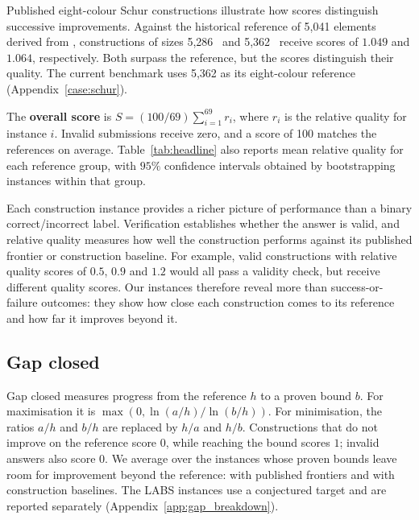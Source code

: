 \documentclass{article}
\begin{document}
Published eight-colour Schur constructions illustrate how scores distinguish successive improvements. Against the historical reference of 5,041 elements derived from \citet{fredricksen2000schur}, constructions of sizes 5,286~\citep{rowley2021templates} and 5,362~\citep{bengone2026schur} receive scores of $1.049$ and $1.064$, respectively. Both surpass the reference, but the scores distinguish their quality. The current benchmark uses 5,362 as its eight-colour reference (Appendix~\ref{case:schur}).

The \textbf{overall score} is $S=(100/69)\sum_{i=1}^{69}r_i$, where $r_i$ is the relative quality for instance $i$. Invalid submissions receive zero, and a score of 100 matches the references on average. Table~\ref{tab:headline} also reports mean relative quality for each reference group, with $95\%$ confidence intervals obtained by bootstrapping instances within that group.

\pagebreak
Each construction instance provides a richer picture of performance than a binary correct/incorrect label. Verification establishes whether the answer is valid, and relative quality measures how well the construction performs against its published frontier or construction baseline. For example, valid constructions with relative quality scores of $0.5$, $0.9$ and $1.2$ would all pass a validity check, but receive different quality scores. Our \DistinctN{} instances therefore reveal more than \DistinctN{} success-or-failure outcomes: they show how close each construction comes to its reference and how far it improves beyond it.

\subsection{Gap closed}
\label{sec:headroom}
Gap closed measures progress from the reference $h$ to a proven bound $b$. For maximisation it is $\max(0,\ln(a/h)/\ln(b/h))$. For minimisation, the ratios $a/h$ and $b/h$ are replaced by $h/a$ and $h/b$. Constructions that do not improve on the reference score $0$, while reaching the bound scores $1$; invalid answers also score $0$. We average over the \GapN{} instances whose proven bounds leave room for improvement beyond the reference: \GapPublishedN{} with published frontiers and \GapConstructionN{} with construction baselines. The \TargetN{} LABS instances use a conjectured target and are reported separately (Appendix~\ref{app:gap_breakdown}).
\end{document}
